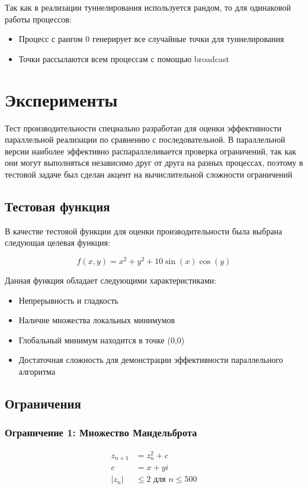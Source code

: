 \documentclass[12pt]{article}
\begin{document}
Так как в реализации туннелирования используется рандом, то для одинаковой работы процессов:
\begin{itemize}
    \item Процесс с рангом 0 генерирует все случайные точки для туннелирования
    \item Точки рассылаются всем процессам с помощью broadcast
\end{itemize}
\newpage

\section{Эксперименты}

Тест производительности специально разработан для оценки эффективности параллельной реализации по сравнению с последовательной. В параллельной версии наиболее эффективно распараллеливается проверка ограничений, так как они могут выполняться независимо друг от друга на разных процессах, поэтому в тестовой задаче был сделан акцент на вычислительной сложности ограничений

\subsection{Тестовая функция}

В качестве тестовой функции для оценки производительности была выбрана следующая целевая функция:

\begin{equation}
f(x,y) = x^2 + y^2 + 10\sin(x)\cos(y)
\end{equation}

Данная функция обладает следующими характеристиками:
\begin{itemize}
    \item Непрерывность и гладкость
    \item Наличие множества локальных минимумов
    \item Глобальный минимум находится в точке (0,0)
    \item Достаточная сложность для демонстрации эффективности параллельного алгоритма
\end{itemize}

\subsection{Ограничения}
\subsubsection{Ограничение 1: Множество Мандельброта}
\begin{equation}
\begin{split}
z_{n+1} &= z_n^2 + c \\
c &= x + yi \\
|z_n| &\leq 2 \text{ для } n \leq 500
\end{split}
\end{equation}
\end{document}
